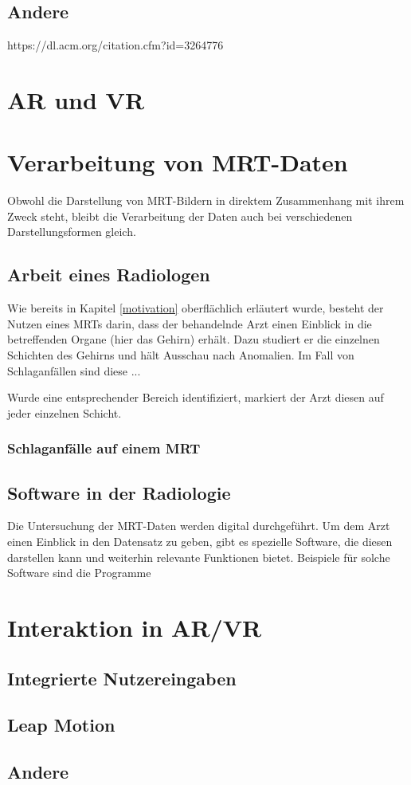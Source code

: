\subsection{Andere}
https://dl.acm.org/citation.cfm?id=3264776
\section{AR und VR}											 %

\section{Verarbeitung von MRT-Daten}						 %
Obwohl die Darstellung von MRT-Bildern in direktem Zusammenhang mit ihrem Zweck steht, bleibt die Verarbeitung der Daten auch bei verschiedenen Darstellungsformen gleich. 

\subsection{Arbeit eines Radiologen}
Wie bereits in Kapitel \ref{motivation} oberflächlich erläutert wurde, besteht der Nutzen eines MRTs darin, dass der behandelnde Arzt einen Einblick in die betreffenden Organe (hier das Gehirn) erhält. Dazu studiert er die einzelnen Schichten des Gehirns und hält Ausschau nach Anomalien.
Im Fall von Schlaganfällen sind diese ...

Wurde eine entsprechender Bereich identifiziert, markiert der Arzt diesen auf jeder einzelnen Schicht. 
\subsubsection{Schlaganfälle auf einem MRT}

\subsection{Software in der Radiologie}
Die Untersuchung der MRT-Daten werden digital durchgeführt. Um dem Arzt einen Einblick in den Datensatz zu geben, gibt es spezielle Software, die diesen darstellen kann und weiterhin relevante Funktionen bietet. Beispiele für solche Software sind die Programme


\section{Interaktion in AR/VR}								 %
\subsection{Integrierte Nutzereingaben}
\subsection{Leap Motion}
\subsection{Andere}







